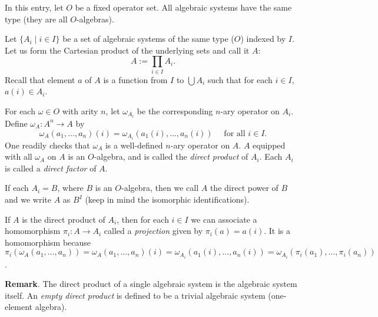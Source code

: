 \documentclass[12pt]{article}
\begin{document}
In this entry, let $O$ be a fixed operator set.  All algebraic systems have the same type (they are all $O$-algebras).

Let $\lbrace A_i\mid i\in I\rbrace$ be a set of algebraic systems of the same type ($O$) indexed by $I$.  Let us form the Cartesian product of the underlying sets and call it $A$:
$$A:=\prod_{i\in I} A_i.$$
Recall that element $a$ of $A$ is a function from $I$ to $\bigcup A_i$ such that for each $i\in I$, $a(i)\in A_i$.  

For each $\omega\in O$ with arity $n$, let $\omega_{A_i}$ be the corresponding $n$-ary operator on $A_i$.  Define $\omega_A: A^n\to A$ by 
$$\omega_A(a_1,\ldots,a_n)(i)=\omega_{A_i}(a_1(i),\ldots,a_n(i))\quad\mbox{ for all }i\in I.$$
One readily checks that $\omega_A$ is a well-defined $n$-ary operator on $A$.  $A$ equipped with all $\omega_A$ on $A$ is an $O$-algebra, and is called the \emph{direct product} of $A_i$.  Each $A_i$ is called a \emph{direct factor} of $A$.

If each $A_i=B$, where $B$ is an $O$-algebra, then we call $A$ the direct power of $B$ and we write $A$ as $B^I$ (keep in mind the isomorphic identifications).

If $A$ is the direct product of $A_i$, then for each $i\in I$ we can associate a  homomorphism $\pi_i:A\to A_i$ called a \emph{projection} given by $\pi_i(a)=a(i)$.  It is a homomorphism because $\pi_i(\omega_A(a_1,\ldots, a_n))=\omega_A(a_1,\ldots, a_n)(i)=\omega_{A_i}(a_1(i),\ldots,a_n(i))=\omega_{A_i}(\pi_i(a_1),\ldots, \pi_i(a_n))$.

\textbf{Remark}.  The direct product of a single algebraic system is the algebraic system itself.  An \emph{empty direct product} is defined to be a trivial algebraic system (one-element algebra).
\end{document}
